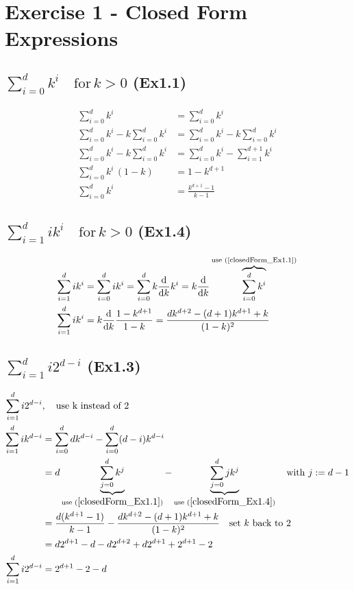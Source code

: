 \section{Exercise 1 - Closed Form Expressions}
\subsection{$\sum_{i=0}^d k^i \quad \mathrm{for } \, k>0$ (Ex1.1)}
\begin{equation}
\begin{aligned}
    \sum_{i=0}^d k^i &= \sum_{i=0}^d k^i \\
    \sum_{i=0}^d k^i - k \sum_{i=0}^d k^i &= \sum_{i=0}^d k^i - k \sum_{i=0}^d k^i \\
    \sum_{i=0}^d k^i - k \sum_{i=0}^d k^i &= \sum_{i=0}^d k^i - \sum_{i=1}^{d+1} k^i \\
    \sum_{i=0}^d k^i \, (1-k) &= 1 - k^{d+1}\\
    \sum_{i=0}^d k^i   &=  \frac{k^{d+1} - 1}{k-1}
    \label{closedForm_Ex1.1}
\end{aligned}
\end{equation}

\subsection{$\sum_{i=1}^d ik^i \quad \mathrm{for } \, k>0$ (Ex1.4)}
\begin{equation}
\begin{aligned}
    \sum_{i=1}^d ik^i &= \sum_{i=0}^d ik^i = 
    \sum_{i=0}^d k \frac{\mathrm{d}}{\mathrm{d}k}k^i =
    k \frac{\mathrm{d}}{\mathrm{d}k} \overbrace{\sum_{i=0}^d k^i}^{\text{use (\ref{closedForm_Ex1.1})}} \\
    \sum_{i=1}^d ik^i &= k \frac{\mathrm{d}}{\mathrm{d}k} \frac{1 - k^{d+1}}{1-k} = 
    \frac{d  k^{d+2} - (d+1)k^{d+1} + k}{(1-k)^2}
    \label{closedForm_Ex1.4}
\end{aligned}
\end{equation}

\subsection{$\sum_{i=1}^d i2^{d-i}$ (Ex1.3)}
\begin{equation}
    \begin{aligned}
        \sum_{i=1}^d i2^{d-i} &, \quad \text{use k instead of 2} \\
        \sum_{i=1}^d ik^{d-i} &= \sum_{i=0}^d dk^{d-i} - \sum_{i=0}^d (d-i)k^{d-i} \\
        &= d\underbrace{\sum_{j=0}^d k^{j}}_{\text{use } (\ref{closedForm_Ex1.1})} - 
        \underbrace{\sum_{j=0}^d jk^{j}}_{\text{use } (\ref{closedForm_Ex1.4})} \quad \text{with } j := d-1 \\
        &= \frac{d(k^{d+1} - 1)}{k-1} - \frac{d  k^{d+2} - (d+1)k^{d+1} + k}{(1-k)^2} \quad \text{set $k$ back to 2} \\
        &= d2^{d+1} - d - d2^{d+2} + d2^{d+1} + 2^{d+1} - 2 \\
        \sum_{i=1}^d i2^{d-i} &= 2^{d+1} -2 - d
        \label{closedForm_Ex1.3}
    \end{aligned}
    \end{equation}

